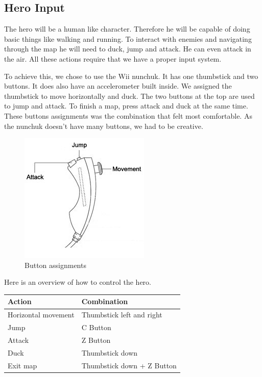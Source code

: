 \subsection{Hero Input}
The hero will be a human like character. Therefore he will be capable
of doing basic things like walking and running. To interact with enemies
and navigating through the map he will need to duck,
jump and attack. He can even attack in the air.
All these actions require that we have a proper input system.

To achieve this, we chose to use the Wii nunchuk. It has one thumbstick
and two buttons. It does also have an accelerometer built inside.
We assigned the thumbstick to move horizontally and duck.
The two buttons at the top are used to jump and attack.
To finish a map, press attack and duck at the same time.\\
These buttons assignments
was the combination that felt most comfortable. As the nunchuk doesn't have many buttons, we had to be creative.

\begin{figure}[H]
  \centering
  \includegraphics[scale=0.6]{Figures/nunchuk}
  \caption{Button assignments}
  \label{fig:Nunchuk}
\end{figure}

Here is an overview of how to control the hero.

\begin{table}[H]
    \centering
    \begin{tabular}{ll}
    Action               & Combination                \\ \hline
    Horizontal movement  & Thumbstick left and right  \\
    Jump                 & C Button                   \\
    Attack               & Z Button                   \\
    Duck                 & Thumbstick down            \\
    Exit map             & Thumbstick down + Z Button \\
    \end{tabular}
\end{table}


